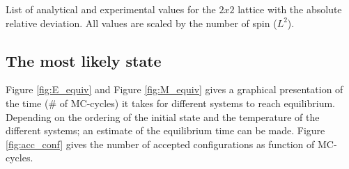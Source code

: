 \documentclass[12pt,english,a4paper]{article}
\begin{document}
\begin{table}[H]
    \centerline{}
    \caption{List of analytical and experimental values for the $2x2$ lattice with the absolute relative deviation. All values are scaled by the number of spin ($L^2$).}
    \label{tab:benchmarks}
\end{table}

\subsection{The most likely state}

Figure \ref{fig:E_equiv} and Figure \ref{fig:M_equiv} gives a graphical presentation of the time ($\#$ of MC-cycles) it takes for different systems to reach equilibrium. Depending on the ordering of the initial state and the temperature of the different systems; an estimate of the equilibrium time can be made. Figure \ref{fig:acc_conf} gives the number of accepted configurations as function of MC-cycles.
\end{document}
